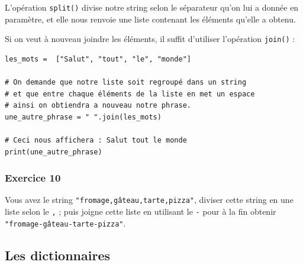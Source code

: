 \documentclass[12pt]{article}
\newcommand{\code}[1]{\colorbox{light-gray}{\texttt{#1}}}
\begin{document}
            L'opération \code{split()} divise notre string selon le séparateur qu'on lui a donnée en paramètre,
            et elle nous renvoie une liste contenant les éléments qu'elle a obtenu.

            Si on veut à nouveau joindre les éléments, il suffit d'utiliser l'opération \code{join()} :
            \begin{lstlisting}[style=code]
les_mots =  ["Salut", "tout", "le", "monde"]

# On demande que notre liste soit regroupé dans un string
# et que entre chaque éléments de la liste en met un espace
# ainsi on obtiendra a nouveau notre phrase.
une_autre_phrase = " ".join(les_mots)

# Ceci nous affichera : Salut tout le monde
print(une_autre_phrase)
            \end{lstlisting}

            \subsubsection{Exercice 10}
                Vous avez le string \code{"fromage,gâteau,tarte,pizza"}, diviser cette string en une liste selon le
                \code{,} ; puis joigne cette liste en utilisant le \code{-} pour à la fin obtenir
                \code{"fromage-gâteau-tarte-pizza"}.

        \subsection{Les dictionnaires}
\end{document}
